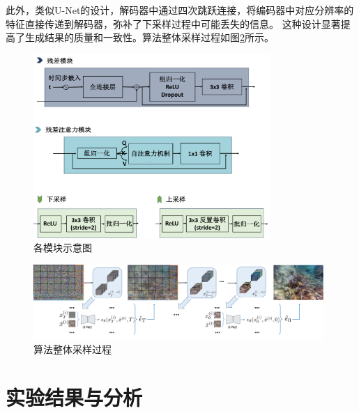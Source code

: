 此外，类似U-Net的设计，解码器中通过四次跳跃连接，将编码器中对应分辨率的特征直接传递到解码器，弥补了下采样过程中可能丢失的信息。
这种设计显著提高了生成结果的质量和一致性。算法整体采样过程如图\ref{img:sample_process}所示。
\begin{figure}[ht]
    \centering
    \includegraphics[width=0.8\textwidth]{figures/ch3/module.pdf}
    \caption{各模块示意图}
    \label{img:module}
    \vspace{0.4cm}
\end{figure}

\begin{figure}[ht]
    \vspace{4mm}
    \centering
    \includegraphics[width=0.98\textwidth]{figures/ch3/sample_process.pdf}
    \caption{算法整体采样过程}
    \label{img:sample_process}
\end{figure} 

\section{实验结果与分析}
